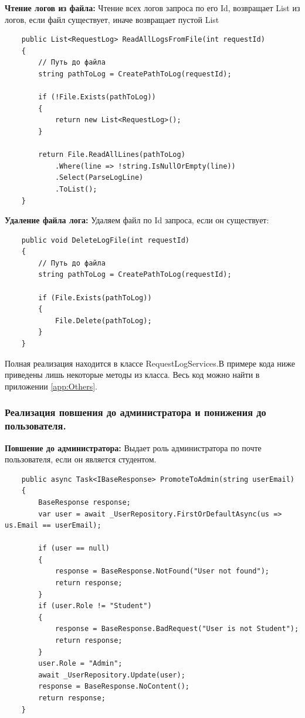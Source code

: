 \textbf{Чтение логов из файла:} Чтение всех логов запроса по его Id, возвращает List из логов, если файл существует, иначе возвращает пустой List
\begin{verbatim}
    public List<RequestLog> ReadAllLogsFromFile(int requestId)
    {
        // Путь до файла
        string pathToLog = CreatePathToLog(requestId);

        if (!File.Exists(pathToLog))
        {
            return new List<RequestLog>();
        }

        return File.ReadAllLines(pathToLog)
            .Where(line => !string.IsNullOrEmpty(line))
            .Select(ParseLogLine)
            .ToList();
    }
\end{verbatim}

\textbf{Удаление файла лога:} Удаляем файл по Id запроса, если он существует:
\begin{verbatim}
    public void DeleteLogFile(int requestId)
    {
        // Путь до файла
        string pathToLog = CreatePathToLog(requestId);

        if (File.Exists(pathToLog))
        {
            File.Delete(pathToLog);
        }
    }
\end{verbatim}

Полная реализация находится в классе RequestLogServices.В примере кода ниже приведены лишь некоторые методы из класса. Весь код можно найти в приложении \ref{app:Others}.

\subsubsection{Реализация повшения до администратора и понижения до пользователя.}

\textbf{Повшение до администратора:} Выдает роль администратора по почте пользователя, если он является студентом.
\begin{verbatim}
    public async Task<IBaseResponse> PromoteToAdmin(string userEmail)
    {
        BaseResponse response;
        var user = await _UserRepository.FirstOrDefaultAsync(us => us.Email == userEmail);

        if (user == null)
        {
            response = BaseResponse.NotFound("User not found");
            return response;
        }
        if (user.Role != "Student")
        {
            response = BaseResponse.BadRequest("User is not Student");
            return response;
        }
        user.Role = "Admin";
        await _UserRepository.Update(user);
        response = BaseResponse.NoContent();
        return response;
    }
\end{verbatim}

